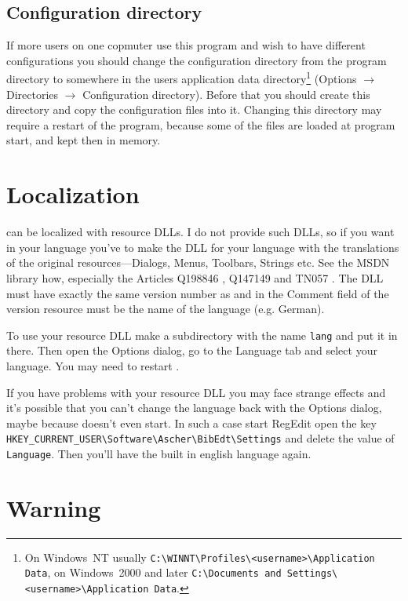 \documentclass[oneside,10pt]{article}
\begin{document}
\subsection{Configuration directory}
\label{sec:ConfigurationDirectory}

If more users on one copmuter use this program and wish to have different configurations
you should change the configuration directory from the program directory to somewhere
in the users application data directory\footnote{On Windows~NT usually
\verb|C:\WINNT\Profiles\<username>\Application Data|, on Windows~2000 and later
\verb|C:\Documents and Settings\<username>\Application Data|.} (Options $\rightarrow$ Directories $\rightarrow$
Configuration directory). Before that you should create this directory
and copy the configuration files into it. Changing this directory may require a
restart of the program, because some of the files are loaded at program start, and
kept then in memory.

\section{Localization}
\label{sec:Localization}

\BibEdt{} can be localized with resource DLLs. I do not provide such DLLs, so if
you want \BibEdt{} in your language you've to make the DLL for your language with
the translations of the original resources---Dialogs, Menus, Toolbars, Strings etc. See the MSDN library
how, especially the Articles Q198846 \cite{microsoft:2004}, Q147149 \cite{microsoft:2004a} and
TN057 \cite{microsoft:2004b}.
The DLL must have exactly the same version number as \BibEdt{} and in the Comment
field of the version resource must be the name of the language (e.g. German).

To use your resource DLL make a subdirectory with the name \verb|lang| and put it
in there. Then open the Options dialog, go to the Language tab and select your
language. You may need to restart \BibEdt{}.

If you have problems with your resource DLL you may face strange effects and it's
possible that you can't change the language back with the Options dialog, maybe
because \BibEdt{} doesn't even start. In such a case start RegEdit open the key
\verb|HKEY_CURRENT_USER\Software\Ascher\BibEdt\Settings| and delete the value of
\verb|Language|. Then you'll have the built in english language again.

\section{Warning}
\label{sec:Warning}
\end{document}
